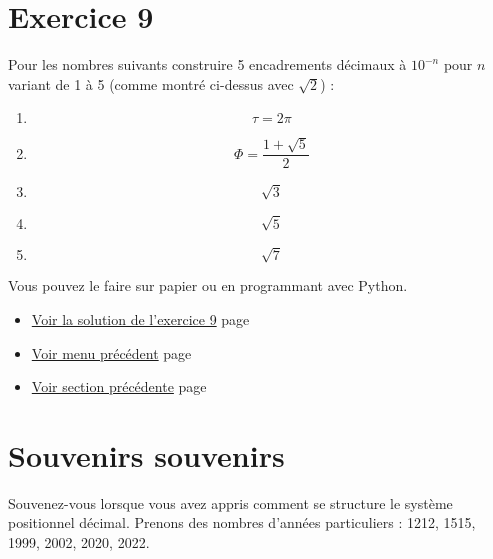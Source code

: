 \documentclass[a4paper,11pt]{book}
\begin{document}
\section{Exercice 9}
\label{sec:org4dd5d0e}
\label{org3125f8c}
\label{page:sec2.5.2exo9}

Pour les nombres suivants construire 5 encadrements
décimaux à \(10^{-n}\) pour \(n\) variant de 1
à 5 (comme montré ci-dessus avec \(\sqrt{2}\)) :

\begin{enumerate}
\item \[\tau = 2\pi\]
\item \[\Phi = \dfrac{1 + \sqrt{5}}{2}\]
\item \[\sqrt{3}\]
\item \[\sqrt{5}\]
\item \[\sqrt{7}\]
\end{enumerate}


Vous pouvez le faire sur papier ou en programmant avec Python.

\begin{itemize}
\item \hyperref[orgd0fbac8]{Voir la solution de l'exercice 9}
page~\pageref{page:sec8.5.1sol9}
\item \hyperref[orgdd2209a]{Voir menu précédent}
page~\pageref{page:content5-menu}
\item \hyperref[org004baf8]{Voir section précédente}
page~\pageref{page:sec2.5.1intro-dec}
\end{itemize}


\clearpage

\section{Souvenirs souvenirs}
\label{sec:org102f2d9}
\label{org2d0b4af}
\label{page:sec2.5.3souv}

Souvenez-vous lorsque vous avez appris comment se structure le
système positionnel décimal. Prenons des nombres
d'années particuliers : 1212, 1515, 1999, 2002, 2020, 2022.
\end{document}
